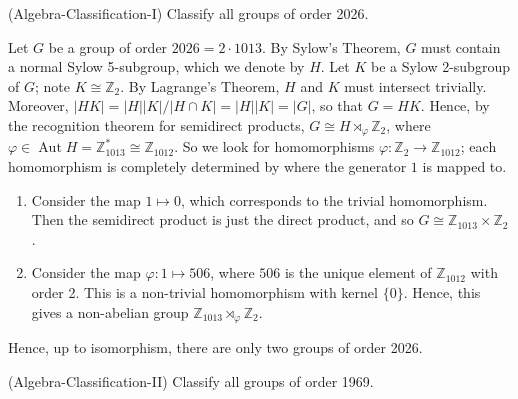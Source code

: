\documentclass{article}
\begin{document}
\begin{prb}{(Algebra-Classification-I)}
	Classify all groups of order 2026. 
\end{prb}
\begin{solutions}
	Let $G$ be a group of order $2026 = 2 \cdot 1013$. By Sylow's Theorem, $G$ must contain a normal Sylow 5-subgroup, which we denote by $H$. Let $K$ be a Sylow 2-subgroup of $G$; note $K \cong \mathbb{Z}_{2}$. By Lagrange's Theorem, $H$ and $K$ must intersect trivially. Moreover, $|HK| = |H||K|/|H \cap K| = |H||K| = |G|$, so that $G = HK$. Hence, by the recognition theorem for semidirect products, $G \cong H \rtimes_{\varphi} \mathbb{Z}_{2}$, where $\varphi \in \operatorname{Aut}{H} = \mathbb{Z}_{1013}^{\ast} \cong \mathbb{Z}_{1012}$. So we look for homomorphisms $\varphi: \mathbb{Z}_{2} \to \mathbb{Z}_{1012}$; each homomorphism is completely determined by where the generator $1$ is mapped to. 
		\begin{enumerate}[itemsep =-2pt,label = (\roman{*})]
			\item Consider the map $1 \mapsto 0$, which corresponds to the trivial homomorphism. Then the semidirect product is just the direct product, and so $G \cong \mathbb{Z}_{1013} \times \mathbb{Z}_{2}$. 
			\item Consider the map $\varphi: 1 \mapsto 506$, where $506$ is the unique element of $\mathbb{Z}_{1012}$ with order 2. This is a non-trivial homomorphism with kernel $\{0\}$. Hence, this gives a non-abelian group $\mathbb{Z}_{1013} \rtimes_{\varphi} \mathbb{Z}_{2}$. 
		\end{enumerate}
	Hence, up to isomorphism, there are only two groups of order 2026. 
\end{solutions} 
\begin{prb}{(Algebra-Classification-II)}
	Classify all groups of order 1969. 
\end{prb}
\end{document}
